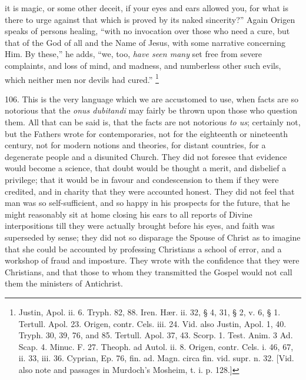 it is magic, or some other deceit, if your eyes and ears allowed you,
for what is there to urge against that which is proved by its naked
sincerity?'' Again Origen speaks of persons healing, ``with no
invocation over those who need a cure, but that of the God of all and
the Name of Jesus, with some narrative concerning Him. By these,'' he
adds, ``we, too, \emph{have seen many} set free from severe complaints,
and loss of mind, and madness, and numberless other such evils,
which neither men nor devils had cured.'' \footnote{Justin, Apol. ii. 6. Tryph. 82, 88. Iren. Hær. ii. 32, § 4, 31, §
2, v. 6, § 1. Tertull. Apol. 23. Origen, contr. Cels. iii. 24. Vid.
also Justin, Apol. 1, 40. Tryph. 30, 39, 76, and 85. Tertull. Apol.
37, 43. Scorp. 1. Test. Anim. 3 Ad. Scap. 4. Minuc. F. 27. Theoph. ad
Autol. ii. 8. Origen, contr. Cels. i. 46, 67, ii. 33, iii. 36.
Cyprian, Ep. 76, fin. ad. Magn. circa fin. vid. supr. n. 32. [Vid.
also note and passages in Murdoch's Mosheim, t. i. p. 128.]}

106.
This is the very language which we are accustomed to use, when facts
are so notorious that the \emph{onus dubitandi} may fairly be thrown
upon those who question them. All that can be said is, that the facts
are not notorious \emph{to us}; certainly not, but the Fathers wrote
for contemporaries, not for the eighteenth or nineteenth century, not
for modern notions and theories, for distant countries, for a
degenerate people and a disunited Church. They did not foresee that
evidence would become a science, that doubt would be thought a merit,
and disbelief a privilege; that it would be in favour and
condescension to them if they were credited, and in charity that they
were accounted honest. They did not feel that man was so
self-sufficient, and so happy in his prospects for the future, that he
might reasonably sit at home closing his ears to all reports of Divine
interpositions till they were actually brought before his eyes, and
faith was superseded by sense; they did not so disparage the Spouse of
Christ as to imagine that she could be accounted by professing
Christians a school of error, and a workshop of fraud and imposture.
They wrote with the confidence that they were Christians, and that
those to whom they transmitted the Gospel would not call them the
ministers of Antichrist.


